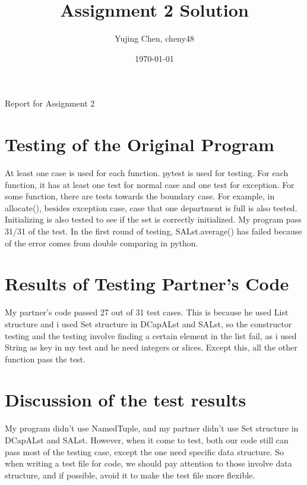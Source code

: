 \documentclass[12pt]{article}
\title{Assignment 2 Solution}
\author{Yujing Chen, cheny48}
\date{\today}
\begin{document}
\maketitle

Report for Assignment 2

\section{Testing of the Original Program}

At least one case is used for each function. pytest is used for testing.
For each function, it has at least one test for normal case and one test for exception. For some function,
there are tests towards the boundary case. For example, in allocate(), besides exception case, case that one department is full is also tested. 
Initializing is also tested to see if the set is correctly initialized.
My program pass 31/31 of the test. In the first round of testing, SALst.average() has failed because of the error comes from double comparing in python.

\section{Results of Testing Partner's Code}

My partner's code passed  27 out of 31 test cases. This is because he used List structure and i used Set structure in DCapALst and SALst, so the constructor testing and the testing involve finding a certain element in the list fail, as i used String as key in my test and he need integers or slices. Except this, all the other function pass the test. 

\section{Discussion of the test results}
My program didn't use NamedTuple, and my partner didn't use Set structure in DCapALst and SALst. However, when it come to test, both our code still can pass most of the testing case, except the one need specific data structure. So when writing a test file for code, we should pay attention to those involve data structure, and if possible, avoid it to make the test file more flexible. 
\end{document}
